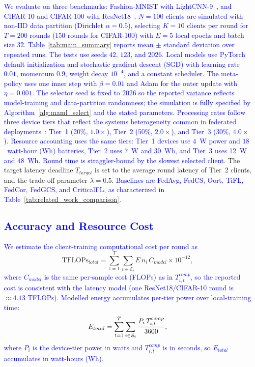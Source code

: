 \documentclass[journal]{IEEEtran}
\newcommand{\revision}[1]{\textcolor{blue}{#1}}
\begin{document}
\revision{We evaluate on three benchmarks: Fashion-MNIST with LightCNN-9~\cite{wu2018light}, and CIFAR-10 and CIFAR-100 with ResNet18~\cite{he2016deep}.} \revision{$N = 100$ clients are simulated with non-IID data partition (Dirichlet $\alpha = 0.5$), selecting $K = 10$ clients per round for $T = 200$ rounds (\revision{$150$ rounds for CIFAR-100}) with $E = 5$ local epochs and batch size 32.} \revision{Table~\ref{tab:main_summary} reports mean $\pm$ standard deviation over repeated runs. The tests use seeds $42$, $123$, and $2026$.} \revision{Local models use PyTorch default initialization and stochastic gradient descent (SGD) with learning rate $0.01$, momentum $0.9$, weight decay $10^{-4}$, and a constant scheduler. The meta-policy uses one inner step with $\beta=0.01$ and Adam for the outer update with $\eta=0.001$. The selector seed is fixed to $2026$ so the reported variance reflects model-training and data-partition randomness; the simulation is fully specified by Algorithm~\ref{alg:maml_select} and the stated parameters.} \revision{Processing rates follow three device tiers that reflect the systems heterogeneity common in federated deployments~\cite{li2020federated}: Tier~1 (20\%, $1.0\times$), Tier~2 (50\%, $2.0\times$), and Tier~3 (30\%, $4.0\times$).} \revision{Resource accounting uses the same tiers: Tier~1 devices use $4$~W power and $18$~watt-hour (Wh) batteries, Tier~2 uses 7~W and 30~Wh, and Tier~3 uses 12~W and 48~Wh. Round time is straggler-bound by the slowest selected client. 
} {\color{blue}The target latency deadline $T_{target}$ is set to the average round latency of Tier~2 clients, and the trade-off parameter $\lambda = 0.5$. \revision{Baselines are FedAvg, FedCS, Oort, TiFL, FedCor, FedGCS, and CriticalFL, as characterized in Table~\ref{tab:related_work_comparison}.}}

\subsection{\revision{Accuracy and Resource Cost}}
\revision{We estimate the client-training computational cost per round as}
\begin{equation}
	\text{TFLOPs}_{total} = \sum_{t=1}^{T} \sum_{i \in \mathcal{S}_t} E\, n_i\, C_{model} \times 10^{-12},
	\label{eq:tflops}
\end{equation}
\revision{where $C_{model}$ is the same per-sample cost (FLOPs) as in $T_{i,t}^{comp}$, so the reported cost is consistent with the latency model (one ResNet18/CIFAR-10 round is $\approx4.13$ TFLOPs). Modelled energy accumulates per-tier power over local-training time:}
\begin{equation}
\color{black}
E_{total}=\sum_{t=1}^{T}\sum_{i\in\mathcal{S}_t} \frac{P_i\,T_{i,t}^{comp}}{3600},
\label{eq:energy}
\end{equation}
\revision{where $P_i$ is the device-tier power in watts and $T_{i,t}^{comp}$ is in seconds, so $E_{total}$ accumulates in watt-hours (Wh).}
\end{document}
